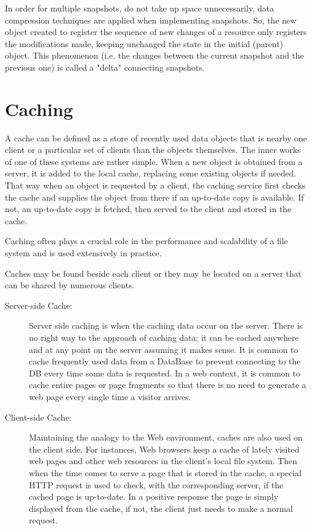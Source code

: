 In order for multiple snapshots, do not take up space unnecessarily, data compression techniques are applied when implementing snapshots. So, the new object created to register the sequence of new changes of a resource only registers the modifications made, keeping unchanged the state in the initial (parent) object. This phenomenon (i.e. the changes between the current snapshot and the previous one) is called a "delta" connecting snapshots.



\section{Caching} %
\label{sec:res_caching}


A cache can be defined as a store of recently used data objects that is nearby one client or a particular set of clients than the objects themselves. The inner works of one of these systems are rather simple. When a new object is obtained from a server, it is added to the local cache, replacing some existing objects if needed. That way when an object is requested by a client, the caching service first checks the cache and supplies the object from there if an up-to-date copy is available. If not, an up-to-date copy is fetched, then served to the client and stored in the cache. 

Caching often plays a crucial role in the performance and scalability of a file system and is used extensively in practice.

Caches may be found beside each client or they may be located on a server that can be shared by numerous clients.

\begin{description}
	\item [Server-side Cache:] Server side caching is when the caching data occur on the server. There is no right way to the approach of caching data; it can be cached anywhere and at any point on the server assuming it makes sense. It is common to cache frequently used data from a DataBase to prevent connecting to the DB every time some data is requested. In a web context, it is common to cache entire pages or page fragments so that there is no need to generate a web page every single time a visitor arrives.
	\item [Client-side Cache:] Maintaining the analogy to the Web environment, caches are also used on the client side. For instances, Web browsers keep a cache of lately visited web pages and other web resources in the client’s local file system. Then when the time comes to serve a page that is stored in the cache, a special HTTP request is used to check, with the corresponding server, if the cached page is up-to-date. In a positive response the page is simply displayed from the cache, if not, the client just needs to make a normal request.
\end{description}



